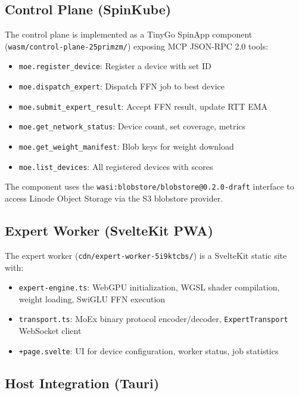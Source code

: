 \documentclass[11pt,a4paper]{article}
\begin{document}
\subsection{Control Plane (SpinKube)}

The control plane is implemented as a TinyGo SpinApp component
(\texttt{wasm/control-plane-25primzm/}) exposing MCP JSON-RPC 2.0
tools:

\begin{itemize}
  \item \texttt{moe.register\_device}: Register a device with set ID
  \item \texttt{moe.dispatch\_expert}: Dispatch FFN job to best device
  \item \texttt{moe.submit\_expert\_result}: Accept FFN result, update
    RTT EMA
  \item \texttt{moe.get\_network\_status}: Device count, set coverage,
    metrics
  \item \texttt{moe.get\_weight\_manifest}: Blob keys for weight download
  \item \texttt{moe.list\_devices}: All registered devices with scores
\end{itemize}

The component uses the \texttt{wasi:blobstore/blobstore@0.2.0-draft}
interface to access Linode Object Storage via the S3 blobstore
provider.

\subsection{Expert Worker (SvelteKit PWA)}

The expert worker (\texttt{cdn/expert-worker-5i9ktcbs/}) is a
SvelteKit static site with:

\begin{itemize}
  \item \texttt{expert-engine.ts}: WebGPU initialization, WGSL shader
    compilation, weight loading, SwiGLU FFN execution
  \item \texttt{transport.ts}: MoEx binary protocol
    encoder/decoder, \texttt{ExpertTransport} WebSocket client
  \item \texttt{+page.svelte}: UI for device configuration, worker
    status, job statistics
\end{itemize}

\subsection{Host Integration (Tauri)}
\end{document}
